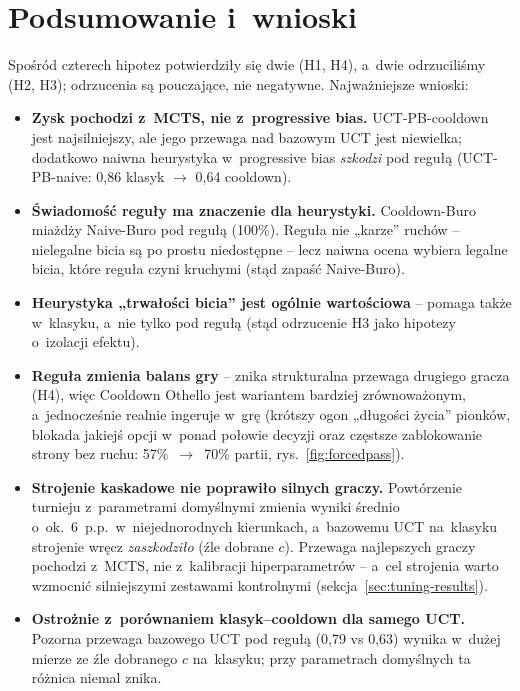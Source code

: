 \documentclass[12pt,a4paper]{article}
\begin{document}
\section{Podsumowanie i~wnioski}\label{sec:wnioski}
Spośród czterech hipotez potwierdziły się dwie (H1, H4), a~dwie odrzuciliśmy (H2, H3); odrzucenia
są pouczające, nie negatywne. Najważniejsze wnioski:
\begin{itemize}[leftmargin=1.4em,itemsep=2pt]
  \item \textbf{Zysk pochodzi z~MCTS, nie z~progressive bias.} UCT-PB-cooldown jest najsilniejszy,
    ale jego przewaga nad bazowym UCT jest niewielka; dodatkowo naiwna heurystyka w~progressive
    bias \emph{szkodzi} pod regułą (UCT-PB-naive: 0,86 klasyk $\to$ 0,64 cooldown).
  \item \textbf{Świadomość reguły ma znaczenie dla heurystyki.} Cooldown-Buro miażdży Naive-Buro
    pod regułą (100\%). Reguła nie „karze” ruchów -- nielegalne bicia są po prostu niedostępne --
    lecz naiwna ocena wybiera legalne bicia, które reguła czyni kruchymi (stąd zapaść Naive-Buro).
  \item \textbf{Heurystyka „trwałości bicia” jest ogólnie wartościowa} -- pomaga także w~klasyku,
    a~nie tylko pod regułą (stąd odrzucenie H3 jako hipotezy o~izolacji efektu).
  \item \textbf{Reguła zmienia balans gry} -- znika strukturalna przewaga drugiego gracza
    (H4), więc Cooldown Othello jest wariantem bardziej zrównoważonym, a~jednocześnie realnie
    ingeruje w~grę (krótszy ogon „długości życia” pionków, blokada jakiejś opcji w~ponad połowie
    decyzji oraz częstsze zablokowanie strony bez ruchu: 57\%~$\to$~70\% partii,
    rys.~\ref{fig:forcedpass}).
  \item \textbf{Strojenie kaskadowe nie poprawiło silnych graczy.} Powtórzenie turnieju
    z~parametrami domyślnymi zmienia wyniki średnio o~ok.\ 6~p.p.\ w~niejednorodnych kierunkach,
    a~bazowemu UCT na~klasyku strojenie wręcz \emph{zaszkodziło} (źle dobrane $c$). Przewaga
    najlepszych graczy pochodzi z~MCTS, nie z~kalibracji hiperparametrów -- a~cel strojenia warto
    wzmocnić silniejszymi zestawami kontrolnymi (sekcja~\ref{sec:tuning-results}).
  \item \textbf{Ostrożnie z~porównaniem klasyk--cooldown dla samego UCT.} Pozorna przewaga bazowego
    UCT pod regułą (0,79 vs 0,63) wynika w~dużej mierze ze źle dobranego $c$ na~klasyku; przy
    parametrach domyślnych ta różnica niemal znika.
\end{itemize}
\end{document}
